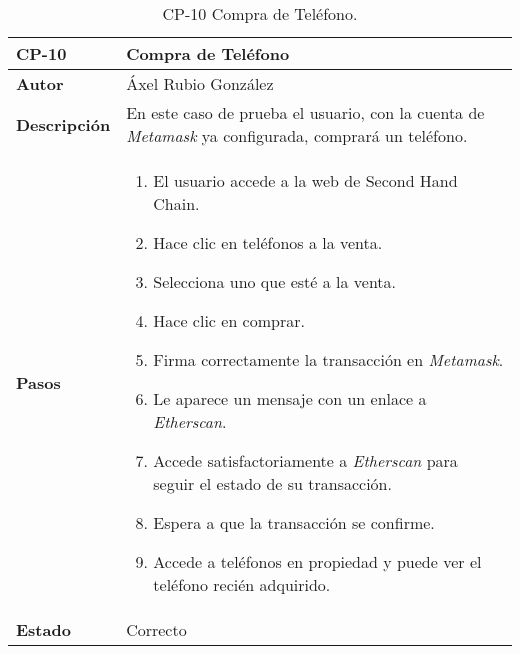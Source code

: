 \begin{table}[p]
	\centering
	\begin{tabularx}{\linewidth}{ p{} p{} }
		\toprule
		\textbf{CP-10}    & \textbf{Compra de Teléfono}\\
		\toprule
		\textbf{Autor}                & Áxel Rubio González \\
		\textbf{Descripción}          & En este caso de prueba el usuario, con la cuenta de \textit{Metamask} ya configurada, comprará un teléfono. \\
		\textbf{Pasos}             &
		\begin{enumerate}
			\def\labelenumi{\arabic{enumi}.}
			\tightlist
			\item El usuario accede a la web de Second Hand Chain.
                \item Hace clic en teléfonos a la venta.
                \item Selecciona uno que esté a la venta.
                \item Hace clic en comprar.
                \item Firma correctamente la transacción en \textit{Metamask}.
                \item Le aparece un mensaje con un enlace a \textit{Etherscan}.
                \item Accede satisfactoriamente a \textit{Etherscan} para seguir el estado de su transacción.
                \item Espera a que la transacción se confirme.
                \item Accede a teléfonos en propiedad y puede ver el teléfono recién adquirido.
		\end{enumerate}\\
		\textbf{Estado}          & Correcto \\
		\bottomrule
	\end{tabularx}
	\caption{CP-10 Compra de Teléfono.}
\end{table}

